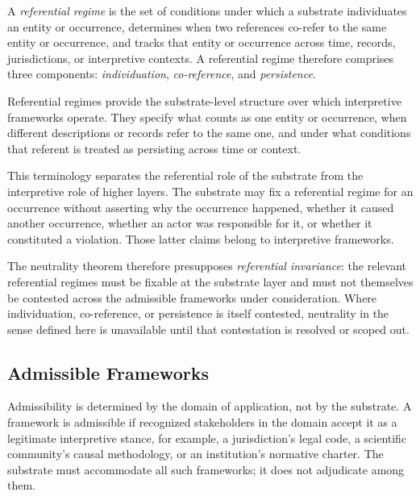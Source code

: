 \begin{definition}
\label{def:referential-regime}
A \emph{referential regime} is the set of conditions under which
a substrate individuates an entity or occurrence,
determines when two references co-refer to the same entity or occurrence,
and tracks that entity or occurrence across time, records,
jurisdictions, or interpretive contexts.
A referential regime therefore comprises three components:
\emph{individuation}, \emph{co-reference}, and \emph{persistence}.
\end{definition}

Referential regimes provide the substrate-level structure
over which interpretive frameworks operate.
They specify what counts as one entity or occurrence,
when different descriptions or records refer to the same one,
and under what conditions that referent is treated as persisting
across time or context.

This terminology separates the referential role of the substrate
from the interpretive role of higher layers.
The substrate may fix a referential regime for an occurrence
without asserting why the occurrence happened,
whether it caused another occurrence,
whether an actor was responsible for it,
or whether it constituted a violation.
Those latter claims belong to interpretive frameworks.

The neutrality theorem therefore presupposes
\emph{referential invariance}:
the relevant referential regimes must be fixable at the substrate layer
and must not themselves be contested
across the admissible frameworks under consideration.
Where individuation, co-reference, or persistence is itself contested,
neutrality in the sense defined here is unavailable until that contestation
is resolved or scoped out.

\subsection{Admissible Frameworks}
\label{subsec:admissible-frameworks}

Admissibility is determined by the domain of application,
not by the substrate.
A framework is admissible if recognized stakeholders
in the domain accept it as a legitimate interpretive stance,
for example, a jurisdiction's legal code,
a scientific community's causal methodology,
or an institution's normative charter.
The substrate must accommodate all such frameworks;
it does not adjudicate among them.

